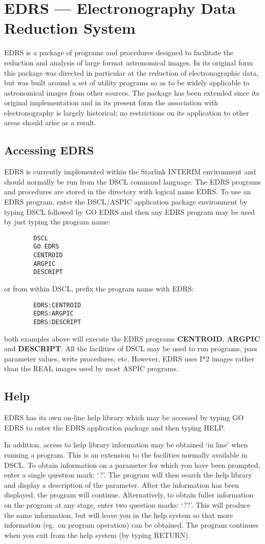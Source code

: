 \section {EDRS --- Electronography Data Reduction System}

EDRS is a package of programs and procedures designed to facilitate the
reduction and analysis of large format astronomical images.
In its original form this package was directed in particular at the reduction
of electronographic data, but was built around a set of utility programs so as
to be widely applicable to astronomical images from other sources.
The package has been extended since its original implementation and in its
present form the association with electronography is largely historical; no
restrictions on its application to other areas should arise as a result.
\subsection {Accessing EDRS}
EDRS is currently implemented within the Starlink INTERIM environment and should
normally be run from the DSCL command language.
The EDRS programs and procedures are stored in the directory with logical name
EDRS.
To use an EDRS program, enter the DSCL/ASPIC application package environment by
typing DSCL followed by GO EDRS and then any EDRS program may be used by just
typing the program name:
\begin{verbatim}
        DSCL
        GO EDRS
        CENTROID
        ARGPIC
        DESCRIPT
\end{verbatim}
or from within DSCL, prefix the program name with EDRS:
\begin{verbatim}
        EDRS:CENTROID
        EDRS:ARGPIC
        EDRS:DESCRIPT
\end{verbatim}
both examples above will execute the EDRS programs {\bf CENTROID}, {\bf ARGPIC}
and {\bf DESCRIPT}.
All the facilities of DSCL may be used to run programs, pass parameter values,
write procedures, etc.
However, EDRS uses I*2 images rather than the REAL images used by most ASPIC
programs.
\subsection {Help}
EDRS has its own on-line help library which may be accessed by typing GO EDRS to
enter the EDRS application package and then typing HELP.

In addition, access to help library information may be obtained `in line' when
running a program.
This is an extension to the facilities normally available in DSCL.
To obtain information on a parameter for which you have been prompted, enter a
single question mark: `?'.
The program will then search the help library and display a description of the
parameter.
After the information has been displayed, the program will continue.
Alternatively, to obtain fuller information on the program at any stage, enter
two question marks: `??'.
This will produce the same information, but will leave you in the help system so
that more information (eg.\ on program operation) can be obtained.
The program continues when you exit from the help system (by typing RETURN).

